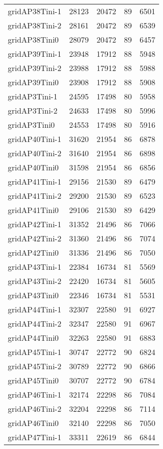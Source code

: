 \begin{longtable}{lrrrr}
gridAP38Tini-1 & 28123 & 20472 & 89 & 6501 \\
gridAP38Tini-2 & 28161 & 20472 & 89 & 6539 \\
gridAP38Tini0 & 28079 & 20472 & 89 & 6457 \\
gridAP39Tini-1 & 23948 & 17912 & 88 & 5948 \\
gridAP39Tini-2 & 23988 & 17912 & 88 & 5988 \\
gridAP39Tini0 & 23908 & 17912 & 88 & 5908 \\
gridAP3Tini-1 & 24595 & 17498 & 80 & 5958 \\
gridAP3Tini-2 & 24633 & 17498 & 80 & 5996 \\
gridAP3Tini0 & 24553 & 17498 & 80 & 5916 \\
gridAP40Tini-1 & 31620 & 21954 & 86 & 6878 \\
gridAP40Tini-2 & 31640 & 21954 & 86 & 6898 \\
gridAP40Tini0 & 31598 & 21954 & 86 & 6856 \\
gridAP41Tini-1 & 29156 & 21530 & 89 & 6479 \\
gridAP41Tini-2 & 29200 & 21530 & 89 & 6523 \\
gridAP41Tini0 & 29106 & 21530 & 89 & 6429 \\
gridAP42Tini-1 & 31352 & 21496 & 86 & 7066 \\
gridAP42Tini-2 & 31360 & 21496 & 86 & 7074 \\
gridAP42Tini0 & 31336 & 21496 & 86 & 7050 \\
gridAP43Tini-1 & 22384 & 16734 & 81 & 5569 \\
gridAP43Tini-2 & 22420 & 16734 & 81 & 5605 \\
gridAP43Tini0 & 22346 & 16734 & 81 & 5531 \\
gridAP44Tini-1 & 32307 & 22580 & 91 & 6927 \\
gridAP44Tini-2 & 32347 & 22580 & 91 & 6967 \\
gridAP44Tini0 & 32263 & 22580 & 91 & 6883 \\
gridAP45Tini-1 & 30747 & 22772 & 90 & 6824 \\
gridAP45Tini-2 & 30789 & 22772 & 90 & 6866 \\
gridAP45Tini0 & 30707 & 22772 & 90 & 6784 \\
gridAP46Tini-1 & 32174 & 22298 & 86 & 7084 \\
gridAP46Tini-2 & 32204 & 22298 & 86 & 7114 \\
gridAP46Tini0 & 32140 & 22298 & 86 & 7050 \\
gridAP47Tini-1 & 33311 & 22619 & 86 & 6844 \\

\end{longtable}
